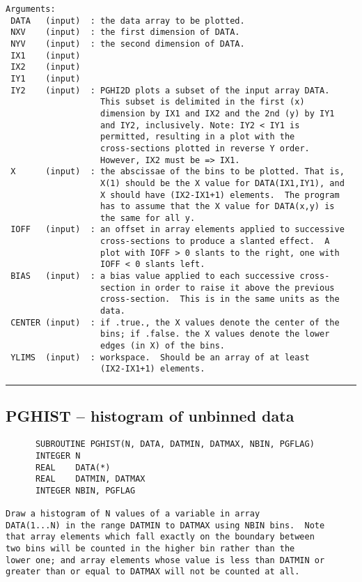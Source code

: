 {\begin{verbatim}
Arguments:
 DATA   (input)  : the data array to be plotted.
 NXV    (input)  : the first dimension of DATA.
 NYV    (input)  : the second dimension of DATA.
 IX1    (input)
 IX2    (input)
 IY1    (input)
 IY2    (input)  : PGHI2D plots a subset of the input array DATA.
                   This subset is delimited in the first (x)
                   dimension by IX1 and IX2 and the 2nd (y) by IY1
                   and IY2, inclusively. Note: IY2 < IY1 is
                   permitted, resulting in a plot with the
                   cross-sections plotted in reverse Y order.
                   However, IX2 must be => IX1.
 X      (input)  : the abscissae of the bins to be plotted. That is,
                   X(1) should be the X value for DATA(IX1,IY1), and
                   X should have (IX2-IX1+1) elements.  The program
                   has to assume that the X value for DATA(x,y) is
                   the same for all y.
 IOFF   (input)  : an offset in array elements applied to successive
                   cross-sections to produce a slanted effect.  A
                   plot with IOFF > 0 slants to the right, one with
                   IOFF < 0 slants left.
 BIAS   (input)  : a bias value applied to each successive cross-
                   section in order to raise it above the previous
                   cross-section.  This is in the same units as the
                   data.
 CENTER (input)  : if .true., the X values denote the center of the
                   bins; if .false. the X values denote the lower
                   edges (in X) of the bins.
 YLIMS  (input)  : workspace.  Should be an array of at least
                   (IX2-IX1+1) elements.
\end{verbatim}
\hrule


\subsection*{PGHIST -- histogram of unbinned data }
\begin{verbatim}
      SUBROUTINE PGHIST(N, DATA, DATMIN, DATMAX, NBIN, PGFLAG)
      INTEGER N
      REAL    DATA(*)
      REAL    DATMIN, DATMAX
      INTEGER NBIN, PGFLAG

Draw a histogram of N values of a variable in array
DATA(1...N) in the range DATMIN to DATMAX using NBIN bins.  Note
that array elements which fall exactly on the boundary between
two bins will be counted in the higher bin rather than the
lower one; and array elements whose value is less than DATMIN or
greater than or equal to DATMAX will not be counted at all.


\end{verbatim}}
